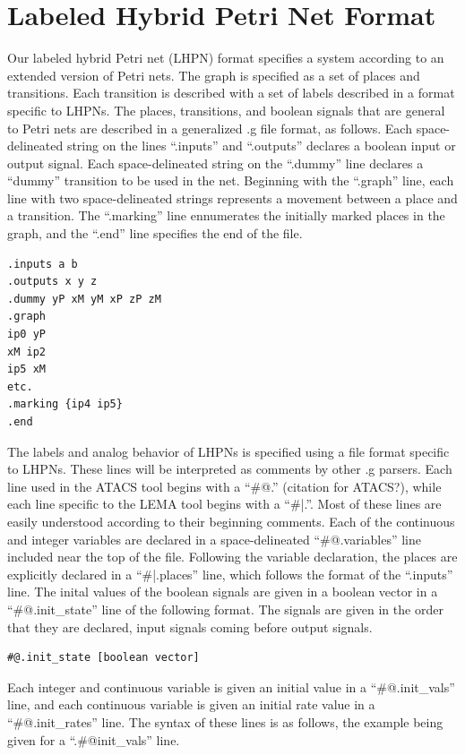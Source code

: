 \documentclass[titlepage,11pt]{article}
\begin{document}
\section{\label{LHPN}Labeled Hybrid Petri Net Format}

\noindent
Our labeled hybrid Petri net (LHPN) format specifies a system according to an
extended version of Petri nets.  The graph is specified as a set of places and
transitions.  Each transition is described with a set of labels described in a
format specific to LHPNs.  The places, transitions, and boolean signals that are
general to Petri nets are described in a generalized .g file format, as follows.
Each space-delineated string on the lines ``.inputs'' and ``.outputs''
declares a boolean input or output signal.  Each space-delineated string on the
``.dummy'' line declares a ``dummy'' transition to be used in the net.
Beginning with the ``.graph'' line, each line with two space-delineated strings
represents a movement between a place and a transition.  The ``.marking'' line
ennumerates the initially marked places in the graph, and the ``.end'' line
specifies the end of the file.

\begin{verbatim}
.inputs a b
.outputs x y z
.dummy yP xM yM xP zP zM
.graph
ip0 yP
xM ip2
ip5 xM
etc.
.marking {ip4 ip5}
.end
\end{verbatim}

The labels and analog behavior of LHPNs is specified using a file format 
specific to LHPNs.  These lines will be interpreted as comments by other .g
parsers.  Each line used in the ATACS tool begins with a ``\#@.'' (citation for
ATACS?), while each line specific to the LEMA tool begins with a ``\#|.''.
Most of these lines are easily understood according to their beginning comments.
Each of the continuous and integer variables are declared in a space-delineated
``\#@.variables'' line included near the top of the file.  Following the 
variable declaration, the places are explicitly declared in a ``\#|.places'' 
line, which follows the format of the ``.inputs'' line.  The inital values of
the boolean signals are given in a boolean vector in a ``\#@.init\_state'' line
of the following format.  The signals are given in the order that they are
declared, input signals coming before output signals.

\begin{verbatim}
#@.init_state [boolean vector]
\end{verbatim}

\noindent
Each integer and continuous variable is given an initial value in a
``\#@.init\_vals'' line, and each continuous variable is given an initial rate
value in a ``\#@.init\_rates'' line.  The syntax of these lines is as follows,
the example being given for a ``.\#@init\_vals'' line.
\end{document}

